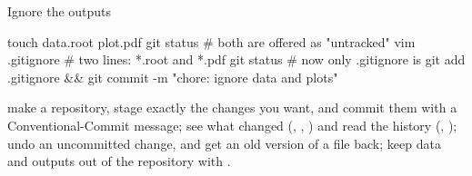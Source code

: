 \begin{exercise}{Ignore the outputs}
\begin{shell}
touch data.root plot.pdf
git status                     # both are offered as "untracked"
vim .gitignore                 # two lines: *.root and *.pdf
git status                     # now only .gitignore is
git add .gitignore && git commit -m "chore: ignore data and plots"
\end{shell}
\end{exercise}

\begin{levelcheck}
\begin{itemize}
  \can make a repository, stage exactly the changes you want, and commit them
       with a Conventional-Commit message;
  \can see what changed (, , ) and
       read the history (, );
  \can undo an uncommitted change, and get an old version of a file back;
  \can keep data and outputs out of the repository with .
\end{itemize}
\end{levelcheck}
